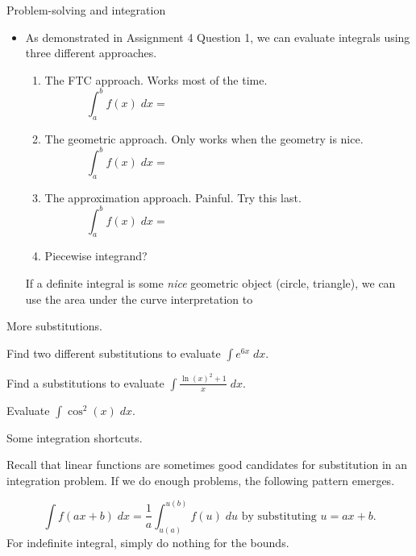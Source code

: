 \documentclass[../main.tex]{subfiles}
\begin{document}
\begin{lesson}{Problem-solving and integration}
\begin{enumerate}[wide, label=\textbf{Part~\arabic*}.]
\begin{itemize}
      \item As demonstrated in Assignment 4 Question 1, we can evaluate integrals using three different approaches. 

        \begin{enumerate}
          \item The FTC approach. Works most of the time.
            \[
              \int_{a}^{b} f(x) \;dx = \hspace{3in}
            \]

          \item The geometric approach. Only works when the geometry is nice.
            \[
              \int_{a}^{b} f(x) \;dx = \hspace{3in}
            \]

          \item The approximation approach. Painful. Try this last. 
            \[
              \int_{a}^{b} f(x) \;dx = \hspace{3in}
            \]

          \item Piecewise integrand? 
        \end{enumerate}

        If a definite integral is some \emph{nice} geometric object (circle, triangle), we can use the area under the curve interpretation to 
    \end{itemize}
  \end{enumerate}

  More substitutions.

  \begin{example}
    Find two different substitutions to evaluate \(\int e^{6x} \;dx\).
  \end{example}

  \begin{example}
    Find a substitutions to evaluate \(\int \frac{\ln(x)^{2} + 1}{x} \;dx\).
  \end{example}

  \begin{example}
    Evaluate \(\int \cos^{2}(x) \;dx\).
  \end{example}

  Some integration shortcuts.

  Recall that linear functions are sometimes good candidates for substitution in an integration problem. If we do enough problems, the following pattern emerges.
  \begin{mdframed}[style=simple]
    \begin{equation} \label{eq:integration-affine-substitution}
      \int f(ax+ b) \;dx = \frac{1}{a} \int_{u(a)}^{u(b)} f(u) \;du \text{ by substituting } u = ax + b.
    \end{equation}
  For indefinite integral, simply do nothing for the bounds. 
  \end{mdframed}
  

\end{lesson}
\end{document}
